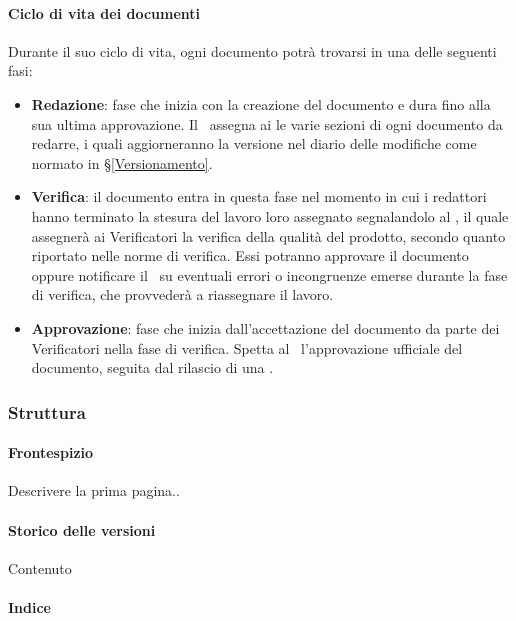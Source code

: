 			\paragraph{Ciclo di vita dei documenti}\label{PS:Documentazione:Implementazione:CicloVita}
			Durante il suo ciclo di vita, ogni documento potrà trovarsi in una delle seguenti fasi:
			\begin{itemize}
				\item \textbf{Redazione}: fase che inizia con la creazione del documento e dura fino alla sua ultima approvazione.
					Il \Res\ assegna ai  le varie sezioni di ogni documento da redarre, i quali aggiorneranno la versione nel diario delle modifiche
					come normato in \S\ref{Versionamento}.
				\item \textbf{Verifica}: il documento entra in questa fase nel momento in cui i redattori hanno terminato la stesura del lavoro loro assegnato
					segnalandolo al \Res, il quale assegnerà ai Verificatori la verifica della qualità del prodotto, secondo quanto riportato nelle norme di verifica.
					Essi potranno approvare il documento oppure notificare il \Res\ su eventuali errori o incongruenze emerse durante la fase di verifica, che provvederà
					a riassegnare il lavoro.
				\item \textbf{Approvazione}: fase che inizia dall'accettazione del documento da parte dei Verificatori nella fase di verifica. Spetta al \Res\
					l'approvazione ufficiale del documento, seguita dal rilascio di una .
			\end{itemize}

		\subsubsection{Struttura}\label{PS:Documentazione:Struttura}

			\paragraph{Frontespizio}\label{PS:Documentazione:Struttura:Frontespizio}
			Descrivere la prima pagina..

			\paragraph{Storico delle versioni}\label{PS:Documentazione:Struttura:StoricoVersioni}
			Contenuto

			\paragraph{Indice}\label{PS:Documentazione:Struttura:Indice}


